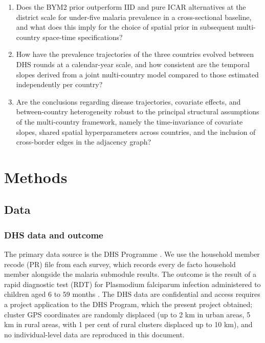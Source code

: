 \documentclass{article}
\begin{document}
\begin{enumerate}
\item Does the BYM2 prior outperform IID and pure ICAR alternatives at the district scale for under-five malaria prevalence in a cross-sectional baseline, and what does this imply for the choice of spatial prior in subsequent multi-country space-time specifications?
\item How have the prevalence trajectories of the three countries evolved between DHS rounds at a calendar-year scale, and how consistent are the temporal slopes derived from a joint multi-country model compared to those estimated independently per country?
\item Are the conclusions regarding disease trajectories, covariate effects, and between-country heterogeneity robust to the principal structural assumptions of the multi-country framework, namely the time-invariance of covariate slopes, shared spatial hyperparameters across countries, and the inclusion of cross-border edges in the adjacency graph?
\end{enumerate}

\section{Methods}\label{methods}

\label{sec:methods}

\subsection{Data}\label{data}

\subsubsection{DHS data and outcome}\label{dhs-data-and-outcome}

\label{sec:dhs}

The primary data source is the DHS Programme \citep{croft2018}. We use
the household member recode (PR) file from each survey, which records
every de facto household member alongside the malaria submodule results.
The outcome is the result of a rapid diagnostic test (RDT) for
Plasmodium falciparum infection administered to children aged 6 to 59
months \citep{florey2014}. The DHS data are confidential and access
requires a project application to the DHS Program, which the present
project obtained; cluster GPS coordinates are randomly displaced (up to
2 km in urban areas, 5 km in rural areas, with 1 per cent of rural
clusters displaced up to 10 km), and no individual-level data are
reproduced in this document.
\end{document}
